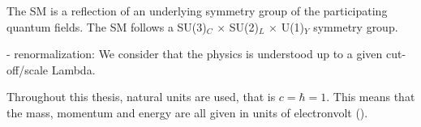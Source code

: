 The SM is a reflection of an underlying symmetry group of the participating quantum fields. 
The SM follows a SU(3)$_C$ $\times$ SU(2)$_L$ $\times$ U(1)$_Y$ symmetry group. 





- renormalization:
We consider that the physics is understood up to a given cut-off/scale Lambda. 

Throughout this thesis, natural units are used, that is $c = \hbar = 1$. This means that the mass, momentum and energy are all given in units of electronvolt (\eV).


